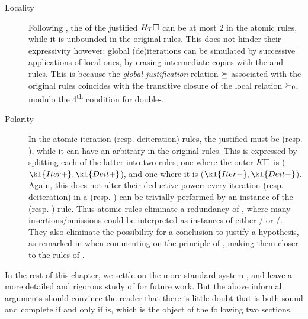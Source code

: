 \begin{scope}
\begin{scope}
\begin{description}
  \item[Locality] Following , the  of the
  justified  $H_T\square$ can be at most $2$ in the atomic rules, while it
  is unbounded in the original rules. This does not hinder their expressivity
  however: global (de)iterations can be simulated by successive applications of
  local ones, by erasing intermediate copies with the  and 
  rules. This is because the \emph{global justification} relation $\mathbin{\succeq}$
  associated with the original rules coincides with the transitive closure of
  the local relation $\mathbin{\succeq_0}$, modulo the 4\textsuperscript{th} condition for
  double-.

  \item[Polarity] In the atomic iteration (resp. deiteration) rules, the
  justified  must be  (resp. ), while it
  can have an arbitrary  in the original rules. This is expressed
  by splitting each of the latter into two rules, one where the outer
   $K\square$ is  ($\kl{Iter{+}},\kl{Deit{+}}$), and one
  where it is  ($\kl{Iter{-}},\kl{Deit{-}}$). Again, this does not
  alter their deductive power: every iteration (resp. deiteration) in a
   (resp. )  can be trivially performed by
  an instance of the  (resp. ) rule. Thus atomic rules eliminate
  a redundancy of , where many insertions/omissions could be
  interpreted as instances of either / or /.
  They also eliminate the possibility for a conclusion to justify a hypothesis,
  as remarked in  when commenting on the principle of
  , making them closer to the rules of .
\end{description}

In the rest of this chapter, we settle on the more standard system ,
and leave a more detailed and rigorous study of  for future work.
But the above informal arguments should convince the reader that there is little
doubt that  is both sound and complete if and only if 
is, which is the object of the following two sections.


\end{scope}
\end{scope}
